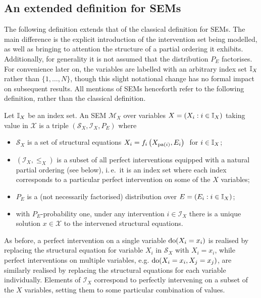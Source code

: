 \subsection{An extended definition for SEMs}

The following definition extends that of the classical definition for SEMs. 
The main difference is the explicit introduction of the intervention set being modelled, as well as bringing to attention the structure of a partial ordering it exhibits.
Additionally, for generality it is not assumed that the distribution $P_E$ factorises.
For convenience later on, the variables are labelled with an arbitrary index set $\mathbb{I}_X$ rather than $\{1,\ldots, N\}$, though this slight notational change has no formal impact on subsequent results.
All mentions of SEMs henceforth refer to the following definition, rather than the classical definition.

\medskip

\begin{definition}\label{def:causality-updated-sem}
	Let $\mathbb{I}_X$ be an index set.
	An SEM $\mathcal{M}_X$ over  variables ${X = (X_i : i\in\mathbb{I}_X )}$ taking value in $\mathcal{X}$ is a triple $\left(\mathcal{S}_X, \mathcal{I}_X, P_{E} \right)$ where
	\begin{itemize}[noitemsep]
		\item $\mathcal{S}_X$ is a set of structural equations $X_i = f_i\left( X_{\operatorname{pa}(i)} , E_i \right)\ $ for $i \in \mathbb{I}_X$;
		\item $(\mathcal{I}_X, \leq_X)$ is a subset of all perfect interventions equipped with a natural partial ordering (see below), i.\,e.\ it is an index set where each index corresponds to a particular perfect intervention on some of the $X$ variables;
		\item $P_{E}$ is a (not necessarily factorised) distribution over $E = ( E_i : i\in\mathbb{I}_X)$;
		\item with $P_E$-probability one, under any intervention ${i \in \mathcal{I}_X}$ there is a unique solution $x\in\mathcal{X}$ to the intervened structural equations. 
	\end{itemize}
\end{definition}
\medskip

As before, a perfect intervention on a single variable $\operatorname{do}(X_i=x_i)$ is realised by replacing the structural equation for variable $X_i$ in $\mathcal{S}_X$ with $X_i = x_i$,
while perfect interventions on multiple variables, e.g. $\operatorname{do}(X_i=x_i, X_j=x_j)$, are similarly realised by replacing the structural equations for each variable individually.
Elements of $\mathcal{I}_X$ correspond to perfectly intervening on a subset of the $X$ variables, setting them to some particular combination of values.

